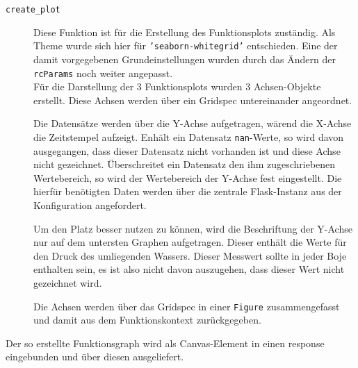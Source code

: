 \begin{description}
 \item [\texttt{create\_plot}]
    Diese Funktion ist für die Erstellung des Funktionsplots zuständig. Als Theme wurde sich hier für \texttt{'seaborn-whitegrid'} entschieden. Eine der damit vorgegebenen Grundeinstellungen wurden durch das Ändern der \texttt{rcParams} noch weiter angepasst.\\
    Für die Darstellung der 3 Funktionsplots wurden 3 Achsen-Objekte erstellt. Diese Achsen werden über ein Gridspec untereinander angeordnet. 
    
    Die Datensätze werden über die Y-Achse aufgetragen, wärend die X-Achse die Zeitstempel aufzeigt. Enhält ein Datensatz \texttt{nan}-Werte, so wird davon ausgegangen, dass dieser Datensatz nicht vorhanden ist und diese Achse nicht gezeichnet. Überschreitet ein Datensatz den ihm zugeschriebenen Wertebereich, so wird der Wertebereich der Y-Achse fest eingestellt. Die hierfür benötigten Daten werden über die zentrale Flask-Instanz aus der Konfiguration angefordert.
    
    Um den Platz besser nutzen zu können, wird die Beschriftung der Y-Achse nur auf dem untersten Graphen aufgetragen. Dieser enthält die Werte für den Druck des umliegenden Wassers. Dieser Messwert sollte in jeder Boje enthalten sein, es ist also nicht davon auszugehen, dass dieser Wert nicht gezeichnet wird. 
    
    Die Achsen werden über das Gridspec in einer \texttt{Figure} zusammengefasst und damit aus dem Funktionskontext zurückgegeben. 
\end{description}

Der so erstellte Funktionsgraph wird als Canvas-Element in einen response eingebunden und über diesen ausgeliefert.




    




